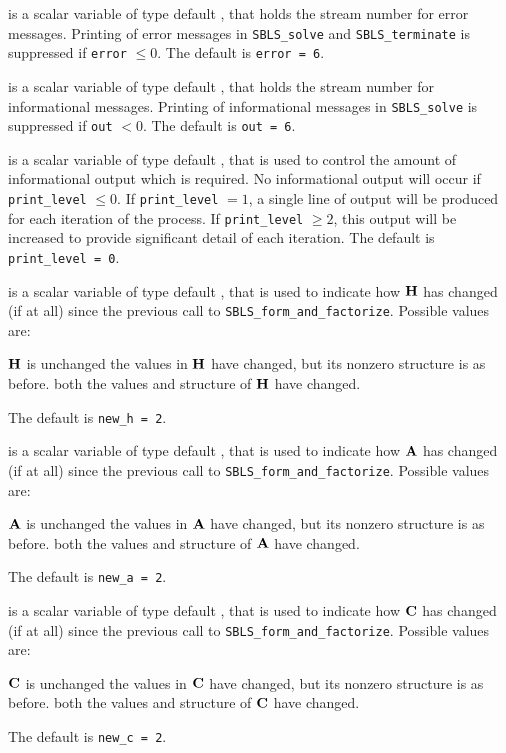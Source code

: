 \documentclass{galahad}
\newcommand{\packagename}{SBLS}
\begin{document}
\begin{description}

 is a scalar variable of type default \integer, that holds the
stream number for error messages. Printing of error messages in
{\tt \packagename\_solve} and {\tt \packagename\_terminate}
is suppressed if {\tt error} $\leq 0$.
The default is {\tt error = 6}.

 is a scalar variable of type default \integer, that holds the
stream number for informational messages. Printing of informational messages in
{\tt \packagename\_solve} is suppressed if {\tt out} $< 0$.
The default is {\tt out = 6}.

 is a scalar variable of type default \integer, that is used
to control the amount of informational output which is required. No
informational output will occur if {\tt print\_level} $\leq 0$. If
{\tt print\_level} $= 1$, a single line of output will be produced for each
iteration of the process. If {\tt print\_level} $\geq 2$, this output will be
increased to provide significant detail of each iteration.
The default is {\tt print\_level = 0}.

 is a scalar variable of type default \integer, that is used
to indicate how ${\mathbf{H}}$ has changed (if at all) since the previous call
to {\tt SBLS\_form\_and\_factorize}. Possible values are:
\begin{description}
 ${\mathbf{H}}$ is unchanged
 the values in ${\mathbf{H}}$ have changed, but its nonzero structure
is as before.
 both the values and structure of ${\mathbf{H}}$ have changed.
\end{description}
The default is {\tt new\_h = 2}.

 is a scalar variable of type default \integer, that is used
to indicate how ${\mathbf{A}}$ has changed (if at all) since the previous call
to {\tt SBLS\_form\_and\_factorize}. Possible values are:
\begin{description}
 ${\mathbf{A}}$ is unchanged
 the values in ${\mathbf{A}}$ have changed, but its nonzero structure
is as before.
 both the values and structure of ${\mathbf{A}}$ have changed.
\end{description}
The default is {\tt new\_a = 2}.

 is a scalar variable of type default \integer, that is used
to indicate how ${\mathbf{C}}$ has changed (if at all) since the previous call
to {\tt SBLS\_form\_and\_factorize}. Possible values are:
\begin{description}
 ${\mathbf{C}}$ is unchanged
 the values in ${\mathbf{C}}$ have changed, but its nonzero structure
is as before.
 both the values and structure of ${\mathbf{C}}$ have changed.
\end{description}
The default is {\tt new\_c = 2}.


\end{description}
\end{document}
